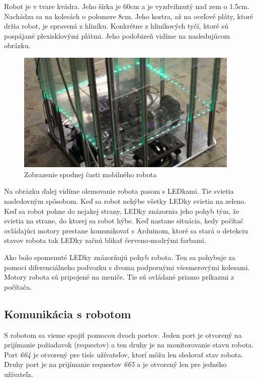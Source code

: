 Robot je v tvare kvádra. Jeho šírka je 60cm a je vyzdvihnutý nad zem o 1.5cm. Nachádza sa na kolesách o polomere 8cm. Jeho kostra, až na oceľové pláty, ktoré držia robot,
je spravená z hliníku. Konkrétne z hliníkových tyčí, ktoré sú pospájané plexisklovými plátmi. Jeho podobizeň vidíme na nasledujúcom obrázku. 

\begin{figure}[!htbp]
	\begin{center}
		\includegraphics[width=0.95\textwidth]{img/robot.png}
	\end{center}
	\caption{Zobrazenie spodnej časti mobilného robota~\cite{timovyProjekt}}
	\label{fig:robot}
\end{figure}

\noindent Na obrázku ďalej vidíme olemovanie robota pasom s LEDkami. Tie svietia nasledovným spôsobom. Keď sa robot nehýbe všetky LEDky svietia
na zeleno. Keď sa robot pohne do nejakej strany, LEDky znázornia jeho pohyb tým, že svietia na strane, do ktorej sa robot hýbe. Keď nastane
situácia, kedy počítač ovládajúci motory prestane komunikovať s Arduinom, ktoré sa stará o detekciu stavov robota tak LEDky začnú blikať červeno-modrými farbami.

Ako bolo spomenuté LEDky znázorňujú pohyb robota. Ten sa pohybuje za pomoci diferenciálneho podvozku s dvoma podpornými všesmerovými kolesami. Motory robota
sú pripojené na meniče. Tie sú ovládané priamo príkazmi z počítača.

\subsection{Komunikácia s robotom}

S robotom sa vieme spojiť pomocou dvoch portov. Jeden port je otvorený na prijímanie požiadavok (requestov) a ten druhy je na monitorovanie stavu robota. 
Port \textit{664} je otvorený pre tisíc užívateľov, ktorí môžu len sledovať stav robota. Druhy port je na prijímanie requestov \textit{665} a je otvorený
len pre jedného užívateľa.

